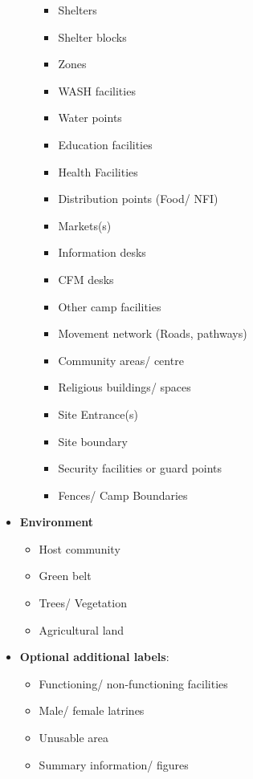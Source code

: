 \documentclass[
  a4paper,
  onecolumn,
  oneside]{book}
\providecommand{\tightlist}{%
  \setlength{\itemsep}{0pt}\setlength{\parskip}{0pt}}\usepackage{longtable,booktabs,array}
\begin{document}
\begin{itemize}
\begin{itemize}
    \begin{itemize}
    \tightlist
    \item
      Shelters
    \item
      Shelter blocks
    \item
      Zones
    \item
      WASH facilities
    \item
      Water points
    \item
      Education facilities
    \item
      Health Facilities
    \item
      Distribution points (Food/ NFI)
    \item
      Markets(s)
    \item
      Information desks
    \item
      CFM desks
    \item
      Other camp facilities
    \item
      Movement network (Roads, pathways)
    \item
      Community areas/ centre
    \item
      Religious buildings/ spaces
    \item
      Site Entrance(s)
    \item
      Site boundary
    \item
      Security facilities or guard points
    \item
      Fences/ Camp Boundaries
    \end{itemize}
  \end{itemize}
\item
  \textbf{Environment}

  \begin{itemize}
  \tightlist
  \item
    Host community
  \item
    Green belt
  \item
    Trees/ Vegetation
  \item
    Agricultural land
  \end{itemize}
\item
  \textbf{Optional additional labels}:

  \begin{itemize}
  \tightlist
  \item
    Functioning/ non-functioning facilities
  \item
    Male/ female latrines
  \item
    Unusable area
  \item
    Summary information/ figures


\end{itemize}
\end{itemize}
\end{document}
